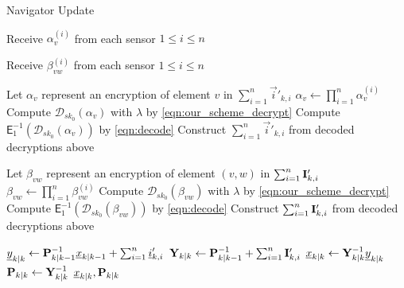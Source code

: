 \documentclass[10pt,letterpaper,oneside,twocolumn,journal]{IEEEtran}
\theoremstyle{definition}
\theoremstyle{definition}
\theoremstyle{remark}
\begin{document}
\begin{algorithm}[htbp]
\caption{Navigator Update}\label{alg:nav_update}
\begin{algorithmic}[1]
    
        \State Receive $\alpha_{v}^{(i)}$ from each sensor $1\leq i \leq n$
    \EndFor

        \State Receive $\beta_{vw}^{(i)}$ from each sensor $1\leq i \leq n$
        \EndFor
    \EndFor

    \State Let $\alpha_{v}$ represent an encryption of element $v$ in $\sum_{i=1}^n\vec{i}'_{k,i}$
        \State $\alpha_{v} \gets \prod_{i=1}^n\alpha_{v}^{(i)}$
        \State Compute $\mathcal{D}_{sk_0}(\alpha_{v})$ with $\lambda$ by \eqref{eqn:our_scheme_decrypt}
        \State Compute $\mathsf{E}^{-1}_{1}(\mathcal{D}_{sk_0}(\alpha_{v}))$ by \eqref{eqn:decode}
    \EndFor
    \State Construct $\sum_{i=1}^n\vec{i}'_{k,i}$ from decoded decryptions above

    \State Let $\beta_{vw}$ represent an encryption of element $(v,w)$ in $\sum_{i=1}^n{{\mathbf{I}}}'_{k,i}$
            \State $\beta_{vw} \gets \prod_{i=1}^n\beta_{vw}^{(i)}$
            \State Compute $\mathcal{D}_{sk_0}(\beta_{vw})$ with $\lambda$ by \eqref{eqn:our_scheme_decrypt}
            \State Compute $\mathsf{E}^{-1}_{1}(\mathcal{D}_{sk_0}(\beta_{vw}))$ by \eqref{eqn:decode}
        \EndFor
    \EndFor
    \State Construct $\sum_{i=1}^n{{\mathbf{I}}}'_{k,i}$ from decoded decryptions above

    \State ${\underline{y}}_{k|k} \gets {\ensuremath{{\mathbf{P}}}}_{k|k-1}^{-1}{\underline{x}}_{k|k-1} + \sum_{i=1}^n{\underline{i}}'_{k,i}$
    \State ${{\mathbf{Y}}}_{k|k} \gets {\ensuremath{{\mathbf{P}}}}_{k|k-1}^{-1} + \sum_{i=1}^n{{\mathbf{I}}}'_{k,i}$
    \State ${\underline{x}}_{k|k} \gets {\ensuremath{{\mathbf{Y}}}}_{k|k}^{-1}{\underline{y}}_{k|k}$
    \State ${{\mathbf{P}}}_{k|k} \gets {\ensuremath{{\mathbf{Y}}}}_{k|k}^{-1}$
    \State \Return ${\underline{x}}_{k|k}, {{\mathbf{P}}}_{k|k}$
    \EndProcedure
\end{algorithmic}
\end{algorithm}
\end{document}
